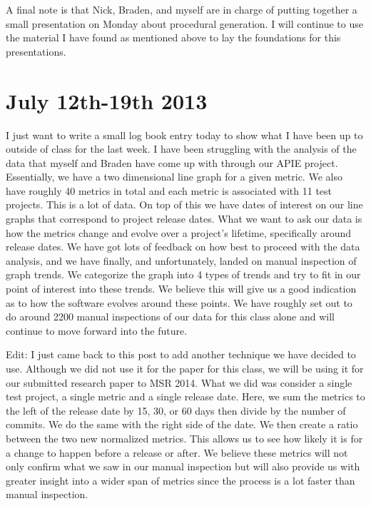 \documentclass[conference]{IEEEtran}
\begin{document}
A final note is that Nick, Braden, and myself are in charge of putting together a small presentation on Monday
about procedural generation. I will continue to use the material I have found as mentioned above to lay the foundations
for this presentations.

\section{July 12th-19th 2013}
I just want to write a small log book entry today to show what I have been up to outside of class for the last week.
I have been struggling with the analysis of the data that myself and Braden have come up with through our APIE project.
Essentially, we have a two dimensional line graph for a given metric. We also have roughly 40 metrics in total and each
metric is associated with 11 test projects. This is a lot of data. On top of this we have dates of interest on our line
graphs that correspond to project release dates. What we want to ask our data is how the metrics change and evolve over
a project's lifetime, specifically around release dates. We have got lots of feedback on how best to proceed with the data
analysis, and we have finally, and unfortunately, landed on manual inspection of graph trends. We categorize the graph into
4 types of trends and try to fit in our point of interest into these trends. We believe this will give us a good 
indication as to how the software evolves around these points. We have roughly set out to do around 2200 manual inspections
of our data for this class alone and will continue to move forward into the future.

Edit: I just came back to this post to add another technique we have decided to use. Although we did not use it for
the paper for this class, we will be using it for our submitted research paper to MSR 2014. What we did was consider
a single test project, a single metric and a single release date. Here, we sum the metrics to the left of the release date
by 15, 30, or 60 days then divide by the number of commits. We do the same with the right side of the date. We then create
a ratio between the two new normalized metrics. This allows us to see how likely it is for a change to happen before
a release or after. We believe these metrics will not only confirm what we saw in our manual inspection but will also
provide us with greater insight into a wider span of metrics since the process is a lot faster than manual inspection.
\end{document}
